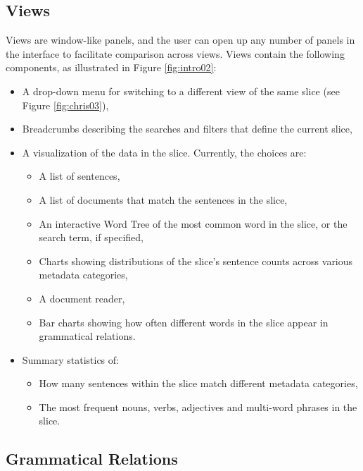 \documentclass{sig-alternate}
\begin{document}
\subsection{Views}
Views  are window-like panels, and the user can open up any number of panels in the interface to facilitate comparison across views.  Views contain the following components, as illustrated in Figure \ref{fig:intro02}:
\begin{itemize}
	\item A drop-down menu for switching to a different view of the same slice (see Figure \ref{fig:chris03}),
	\item Breadcrumbs describing the searches and filters that define the current slice,
	\item A visualization of the data in the slice. Currently, the choices are:
		\begin{itemize}
			\item A list of sentences,
			\item A list of documents that match the sentences in the slice,
			\item An interactive Word Tree \cite{wattenberg_word_2008} of the most common word in the slice, or the search term, if specified,
			\item Charts showing distributions of the slice's sentence counts across various metadata categories,
			\item A document reader,
			\item Bar charts showing how often different words in the slice  appear in grammatical relations.
		\end{itemize}
	\item Summary statistics of:
		\begin{itemize}
			\item How many sentences within the slice match different metadata categories,
			\item The most frequent nouns, verbs, adjectives and multi-word phrases in the slice.
		\end{itemize}
\end{itemize}

\subsection{Grammatical Relations}
\end{document}
